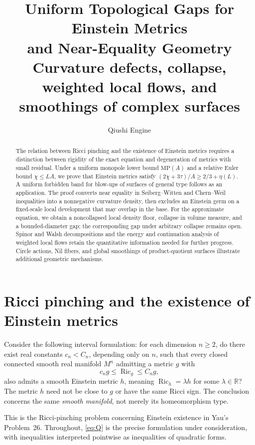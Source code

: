 \documentclass[a4paper,11pt]{article}
\title{Uniform Topological Gaps for Einstein Metrics\\and Near-Equality Geometry\\[0.5em]{\large Curvature defects, collapse, weighted local flows, and smoothings of complex surfaces}}
\author{Qiushi Engine}
\date{}
\numberwithin{equation}{section}
\theoremstyle{definition}
\newcommand{\Ric}{\operatorname{Ric}}
\newcommand{\R}{\mathbb R}
\begin{document}
\maketitle
\begin{abstract}
The relation between Ricci pinching and the existence of Einstein metrics requires a distinction between rigidity of the exact equation and degeneration of metrics with small residual. Under a uniform monopole lower bound $\mathrm{MP}(A)$ and a relative Euler bound $\chi\le LA$, we prove that Einstein metrics satisfy $(2\chi+3\tau)/A\ge2/3+\eta(L)$. A uniform forbidden band for blow-ups of surfaces of general type follows as an application. The proof converts near equality in Seiberg--Witten and Chern--Weil inequalities into a nonnegative curvature density, then excludes an Einstein germ on a fixed-scale local development that may overlap in the base. For the approximate equation, we obtain a noncollapsed local density floor, collapse in volume measure, and a bounded-diameter gap; the corresponding gap under arbitrary collapse remains open. Spinor and Walsh decompositions and the energy and continuation analysis of weighted local flows retain the quantitative information needed for further progress. Circle actions, Nil fibers, and global smoothings of product-quotient surfaces illustrate additional geometric mechanisms.
\end{abstract}
\begingroup
\small\linespread{1.0}\selectfont\setlength{\parskip}{0pt}
\tableofcontents
\endgroup
\clearpage

\section{Ricci pinching and the existence of Einstein metrics}
Consider the following interval formulation: for each dimension $n\ge2$, do there exist real constants $c_n<C_n$, depending only on $n$, such that every closed connected smooth real manifold $M^n$ admitting a metric $g$ with
\begin{equation}\label{eq:Q}
 c_ng\le\Ric_g\le C_ng,
\end{equation}
also admits a smooth Einstein metric $h$, meaning $\Ric_h=\lambda h$ for some $\lambda\in\R$? The metric $h$ need not be close to $g$ or have the same Ricci sign. The conclusion concerns the same \emph{smooth manifold}, not merely its homeomorphism type.

This is the Ricci-pinching problem concerning Einstein existence in Yau's Problem~26\cite{Yau1982}. Throughout, \eqref{eq:Q} is the precise formulation under consideration, with inequalities interpreted pointwise as inequalities of quadratic forms.
\end{document}
